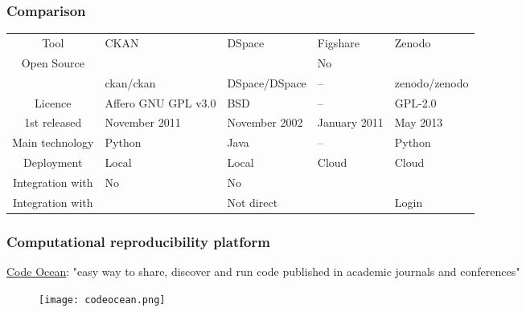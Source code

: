 \begin{frame}
\frametitle{Comparison}

\begin{table}
\scriptsize
\begin{tabularx}{\textwidth}{@{}c P P P P @{}}
 Tool 		& 	CKAN		& DSpace		& 	Figshare 	& Zenodo	\\
Open Source 						&  \yestab		& \yestab		& No			& \yestab	\\
\faGithub							& ckan/ckan 	& DSpace/DSpace & -- 			& zenodo/zenodo	\\
Licence								& Affero GNU GPL v3.0 & BSD 	& -- 			& GPL-2.0		\\
1st released						& November 2011	& November 2002 & January 2011 	& May 2013 		\\
Main technology 					& Python		& Java 			& --			& Python		\\
Deployment							& Local			& Local			& Cloud			& Cloud			\\
Integration with \faGithub 			& No	 		& No			& \yestab 		& \yestab		\\
Integration with \aiOrcid			& \yestab	 	& Not direct 	& \yestab 		& Login			\\
\end{tabularx}
\end{table}


\end{frame}


\begin{frame}
\frametitle{Computational reproducibility platform}
\footnotesize

\href{https://codeocean.com/}{Code Ocean}: "easy way to share, discover and run code published in academic journals and conferences"
\begin{figure}
\texttt{[image: codeocean.png]}
\end{figure}
\end{frame}


